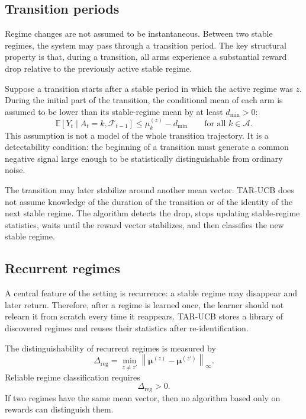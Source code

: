 \documentclass[11pt]{article}
\newcommand{\A}{\mathcal A}
\newcommand{\F}{\mathcal F}
\newcommand{\E}{\mathbb E}
\newcommand{\norm}[1]{\left\lVert #1 \right\rVert}
\begin{document}
\subsection{Transition periods}
\label{subsec:transition_periods}

Regime changes are not assumed to be instantaneous. Between two stable regimes, the system may pass through a transition period. The key structural property is that, during a transition, all arms experience a substantial reward drop relative to the previously active stable regime.

Suppose a transition starts after a stable period in which the active regime was $z$. During the initial part of the transition, the conditional mean of each arm is assumed to be lower than its stable-regime mean by at least $d_{\min}>0$:
\begin{equation}
\label{eq:transition_drop_condition}
\E[Y_t\mid A_t=k,\F_{t-1}]
\leq
\mu_k^{(z)}-d_{\min}
\qquad
\text{for all }k\in\A .
\end{equation}
This assumption is not a model of the whole transition trajectory. It is a detectability condition: the beginning of a transition must generate a common negative signal large enough to be statistically distinguishable from ordinary noise.

The transition may later stabilize around another mean vector. TAR-UCB does not assume knowledge of the duration of the transition or of the identity of the next stable regime. The algorithm detects the drop, stops updating stable-regime statistics, waits until the reward vector stabilizes, and then classifies the new stable regime.

\subsection{Recurrent regimes}
\label{subsec:recurrent_regimes}

A central feature of the setting is recurrence: a stable regime may disappear and later return. Therefore, after a regime is learned once, the learner should not relearn it from scratch every time it reappears. TAR-UCB stores a library of discovered regimes and reuses their statistics after re-identification.

The distinguishability of recurrent regimes is measured by
\begin{equation}
\label{eq:regime_separation}
\Delta_{\mathrm{reg}}
=
\min_{z\neq z'}
\norm{\bm\mu^{(z)}-\bm\mu^{(z')}}_{\infty} .
\end{equation}
Reliable regime classification requires
\begin{equation}
\label{eq:positive_regime_separation}
\Delta_{\mathrm{reg}}>0.
\end{equation}
If two regimes have the same mean vector, then no algorithm based only on rewards can distinguish them.
\end{document}
